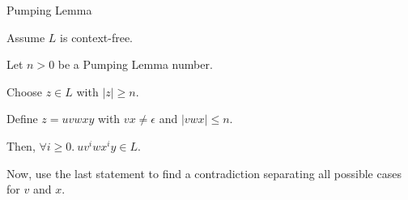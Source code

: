 \documentclass{beamer}
\begin{document}
\begin{frame}{Pumping Lemma}
    \begin{example}
        Assume $L$ is context-free.\par
        Let $n > 0$ be a Pumping Lemma number.\pause\par
        Choose $z \in L$ with $|z| \geq n$.\par
        Define $z = uvwxy$ with $vx \neq \epsilon$ and $|vwx| \leq n$.\pause\par
        Then, $\forall i \geq 0.\ uv^iwx^iy \in L$.\pause\par
        Now, use the last statement to find a contradiction separating all possible cases for $v$ and $x$.
    \end{example}
\end{frame}
\end{document}
